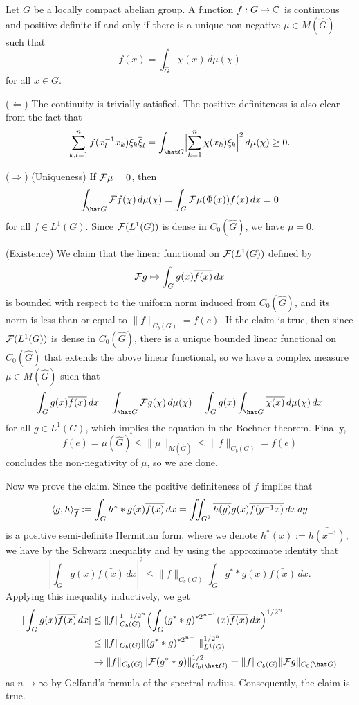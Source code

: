 \documentclass[a4paper]{article}
\begin{document}
\begin{thm}
Let $G$ be a locally compact abelian group.
A function $f:G\to\mathbb{C}$ is continuous and positive definite if and only if there is a unique non-negative $\mu\in M(\hat G)$ such that 
\[f(x)=\int_{\hat G}\chi(x)\,d\mu(\chi)\]
for all $x\in G$.
\end{thm}
\begin{pf}
($\Leftarrow$)
The continuity is trivially satisfied.
The positive definiteness is also clear from the fact that
\[\sum_{k,l=1}^nf(x_l^{-1}x_k)\xi_k\bar\xi_l=\int_{\hat G}\Bigl|\sum_{k=1}^n\chi(x_k)\xi_k\Bigr|^2\,d\mu(\chi)\ge0.\]

($\Rightarrow$)
(Uniqueness)
If $\mathcal{F}\mu=0$, then
\[\int_{\hat G}\cF f(\chi)\,d\mu(\chi)=\int_G\cF\mu(\Phi(x))f(x)\,dx=0\]
for all $f\in L^1(G)$.
Since $\mathcal{F}(L^1(G))$ is dense in $C_0(\hat G)$, we have $\mu=0$.

(Existence)
We claim that the linear functional on $\mathcal{F}(L^1(G))$ defined by
\[\mathcal{F} g\mapsto\int_Gg(x)\overline{f(x)}\,dx\]
is bounded with respect to the uniform norm induced from $C_0(\hat G)$, and its norm is less than or equal to $\|f\|_{C_b(G)}=f(e)$.
If the claim is true, then since $\mathcal{F}(L^1(G))$ is dense in $C_0(\hat G)$, there is a unique bounded linear functional on $C_0(\hat G)$ that extends the above linear functional, so we have a complex measure $\mu\in M(\hat G)$ such that
\[\int_Gg(x)\bar{f(x)}\,dx=\int_{\hat G}\cF g(\chi)\,d\mu(\chi)=\int_G g(x)\int_{\hat G}\bar{\chi(x)}\,d\mu(\chi)\,dx\]
for all $g\in L^1(G)$, which implies the equation in the Bochner theorem.
Finally,
\[f(e)=\mu(\hat G)\le\|\mu\|_{M(\hat G)}\le\|f\|_{C_b(G)}=f(e)\] concludes the non-negativity of $\mu$, so we are done.

Now we prove the claim.
Since the positive definiteness of $\bar f$ implies that
\[\langle g,h\rangle_{\overline f}:=\int_Gh^**g(x)\overline{f(x)}\,dx=\iint_{G^2}\overline{h(y)}g(x)\overline{f(y^{-1}x)}\,dx\,dy\]
is a positive semi-definite Hermitian form, where we denote $h^*(x):=\bar{h(x^{-1})}$, we have by the Schwarz inequality and by using the approximate identity that
\[|\int_Gg(x)\bar{f(x)}\,dx|^2\le\|f\|_{C_b(G)}\int_G g^**g(x)\bar{f(x)}\,dx.\]
Applying this inequality inductively, we get
\begin{align*}
|\int_Gg(x)\bar{f(x)}\,dx|
&\le\|f\|_{C_b(G)}^{1-1/2^n}\Bigl(\int_G(g^**g)^{*2^{n-1}}(x)\bar{f(x)}\,dx\Bigr)^{1/2^n}\\
&\le\|f\|_{C_b(G)}\|(g^**g)^{*2^{n-1}}\|_{L^1(G)}^{1/2^n}\\
&\to\|f\|_{C_b(G)}\|\cF(g^**g)\|_{C_0(\hat G)}^{1/2}=\|f\|_{C_b(G)}\|\cF g\|_{C_0(\hat G)}
\end{align*}
as $n\to\infty$ by Gelfand's formula of the spectral radius.
Consequently, the claim is true.
\end{pf}
\end{document}
